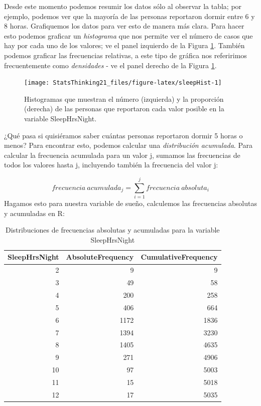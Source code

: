 \documentclass[
  12pt,
]{book}
\begin{document}
Desde este momento podemos resumir los datos sólo al observar la tabla; por ejemplo, podemos ver que la mayoría de las personas reportaron dormir entre 6 y 8 horas. Grafiquemos los datos para ver esto de manera más clara. Para hacer esto podemos graficar un \emph{histograma} que nos permite ver el número de casos que hay por cada uno de los valores; ve el panel izquierdo de la Figura \ref{fig:sleepHist}. También podemos graficar las frecuencias relativas, a este tipo de gráfica nos referirimos frecuentemente como \emph{densidades} - ve el panel derecho de la Figura \ref{fig:sleepHist}.

\begin{figure}
\texttt{[image: StatsThinking21\_files/figure-latex/sleepHist-1]} \caption{Histogramas que muestran el número (izquierda) y la proporción (derecha) de las personas que reportaron cada valor posible en la variable SleepHrsNight.}\label{fig:sleepHist}
\end{figure}

¿Qué pasa si quisiéramos saber cuántas personas reportaron dormir 5 horas o menos? Para encontrar esto, podemos calcular una \emph{distribución acumulada}. Para calcular la frecuencia acumulada para un valor j, sumamos las frecuencias de todos los valores hasta j, incluyendo también la frecuencia del valor j:

\[
frecuencia\ acumulada_j = \sum_{i=1}^{j}{frecuencia\ absoluta_i}
\]
Hagamos esto para nuestra variable de sueño, calculemos las frecuencias absolutas y acumuladas en R:

\newpage

\begin{table}

\caption{\label{tab:unnamed-chunk-9}Distribuciones de frecuencias absolutas y acumuladas para la variable SleepHrsNight}
\centering
\begin{tabular}[t]{r|r|r}
\hline
SleepHrsNight & AbsoluteFrequency & CumulativeFrequency\\
\hline
2 & 9 & 9\\
\hline
3 & 49 & 58\\
\hline
4 & 200 & 258\\
\hline
5 & 406 & 664\\
\hline
6 & 1172 & 1836\\
\hline
7 & 1394 & 3230\\
\hline
8 & 1405 & 4635\\
\hline
9 & 271 & 4906\\
\hline
10 & 97 & 5003\\
\hline
11 & 15 & 5018\\
\hline
12 & 17 & 5035\\
\hline
\end{tabular}
\end{table}
\end{document}
